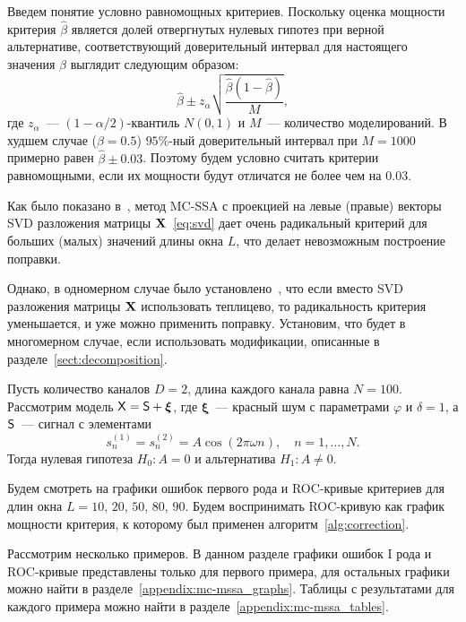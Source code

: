 \documentclass[specialist,
substylefile = spbu_report.rtx,
subf,href,colorlinks=true, 12pt]{disser}
\theoremstyle{definition}
\newcommand{\bfxi}{\boldsymbol{\xi}}
\begin{document}
Введем понятие условно равномощных критериев. Поскольку оценка мощности критерия $\hat \beta$ является долей отвергнутых нулевых гипотез при верной альтернативе, соответствующий доверительный интервал для настоящего значения $\beta$ выглядит следующим образом:
\[
	\hat \beta \pm z_\alpha \sqrt{\frac{\hat \beta(1 - \hat \beta)}M},
\]
где $z_\alpha$~--- $(1-\alpha/2)$-квантиль $N(0, 1)$ и $M$~--- количество моделирований. В худшем случае ($\beta=0.5$) $95\%$-ный доверительный интервал при $M=1000$ примерно равен $\hat\beta \pm 0.03$. Поэтому будем условно считать критерии равномощными, если их мощности будут отличатся не более чем на $0.03$.

Как было показано в~\cite[Приложение  Б.2.4]{Larin2022}, метод MC-SSA с проекцией на левые (правые) векторы SVD разложения матрицы $\mathbf{X}$~\eqref{eq:svd} дает очень радикальный критерий для больших (малых) значений длины окна $L$, что делает невозможным построение поправки.

Однако, в одномерном случае было установлено~\cite{Larin2022}, что если вместо SVD разложения матрицы $\mathbf{X}$ использовать теплицево, то радикальность критерия уменьшается, и уже можно применить поправку. Установим, что будет в многомерном случае, если использовать модификации, описанные в разделе~\ref{sect:decomposition}.

Пусть количество каналов $D=2$, длина каждого канала равна $N=100$. Рассмотрим модель $\tX=\tS+\bfxi$, где $\bfxi$~--- красный шум с параметрами $\varphi$ и $\delta=1$, а $\mathsf{S}$~--- сигнал с элементами
\[
s_n^{(1)}=s_n^{(2)}=A\cos(2\pi\omega n),\quad n=1,\ldots, N.
\]
Тогда нулевая гипотеза $H_0:A=0$ и альтернатива $H_1:A\ne0$.

Будем смотреть на графики ошибок первого рода и ROC-кривые критериев для длин окна $L=10$, $20$, $50$, $80$, $90$. Будем воспринимать ROC-кривую как график мощности критерия, к которому был применен алгоритм~\ref{alg:correction}.

Рассмотрим несколько примеров. В данном разделе графики ошибок I рода и ROC-кривые представлены только для первого примера, для остальных графики можно найти в разделе~\ref{appendix:mc-mssa_graphs}. Таблицы с результатами для каждого примера можно найти в разделе~\ref{appendix:mc-mssa_tables}.
\end{document}
